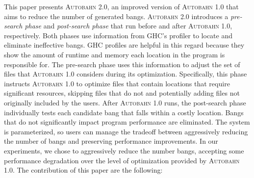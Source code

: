\documentclass[format=sigplan, review=true, 9pt]{acmart}
\newcommand{\Ao}[0]{\textsc{Autobahn 1.0}}
\newcommand{\At}[0]{\textsc{Autobahn 2.0}}
\newcommand{\preopt}[0]{pre-search}
\newcommand{\postopt}[0]{post-search}
\begin{document}
This paper presents \At{}, an improved version of \Ao{} that aims
to reduce the number of generated bangs. 
\At{} introduces a \textit{\preopt{} phase} and
\textit{\postopt{} phase} that run before and after \Ao{},
respectively.  Both phases use information from GHC's profiler to
locate and eliminate ineffective bangs. 
GHC profiles are helpful in this regard because they
show the amount of runtime and memory each location in the
program is responsible for. The \preopt{} phase uses this information to adjust the set of files that
\Ao{} considers during its optimization.
Specifically, this phase instructs \Ao{} to
optimize files that contain locations that require significant
resources, skipping files that do not and
potentially adding files not originally included by the users.
After \Ao{} runs, the \postopt{} phase individually tests
each candidate bang that falls within a costly location. Bangs that
do not significantly impact program performance are
eliminated.   The system is parameterized, so users can manage the
tradeoff between aggressively reducing the number of bangs and
preserving performance improvements.  In our experiments, we chose to
aggressively reduce the number bangs, accepting some performance
degradation over the level of optimization provided by \Ao{}.
The contribution of this paper are the following:
\end{document}
